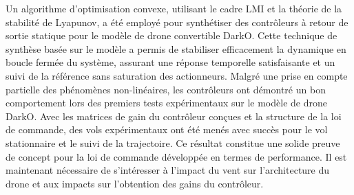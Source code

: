 Un algorithme d'optimisation convexe, utilisant le cadre LMI et la théorie de la stabilité de Lyapunov, a été employé pour synthétiser des contrôleurs à retour de sortie statique pour le modèle de drone convertible DarkO. Cette technique de synthèse basée sur le modèle a permis de stabiliser efficacement la dynamique en boucle fermée du système, assurant une réponse temporelle satisfaisante et un suivi de la référence sans saturation des actionneurs. Malgré une prise en compte partielle des phénomènes non-linéaires, les contrôleurs ont démontré un bon comportement lors des premiers tests expérimentaux sur le modèle de drone DarkO. Avec les matrices de gain du contrôleur conçues et la structure de la loi de commande, des vols expérimentaux ont été menés avec succès pour le vol stationnaire et le suivi de la trajectoire. Ce résultat constitue une solide preuve de concept pour la loi de commande développée en termes de performance.
Il est maintenant nécessaire de s'intéresser à l'impact du vent sur l'architecture du drone et aux impacts sur l'obtention des gains du contrôleur.
